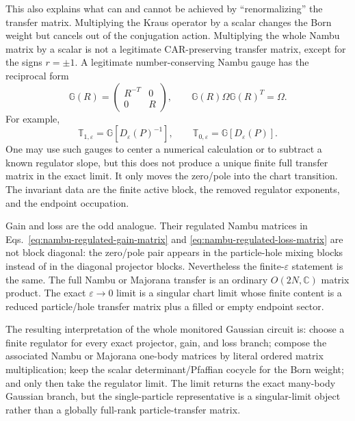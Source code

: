 \documentclass[aps,prb,onecolumn,nofootinbib,superscriptaddress]{revtex4-2}
\theoremstyle{plain}
\theoremstyle{definition}
\begin{document}
This also explains what can and cannot be achieved by ``renormalizing'' the
transfer matrix.  Multiplying the Kraus operator by a scalar changes the Born
weight but cancels out of the conjugation action.  Multiplying the whole
Nambu matrix by a scalar is not a legitimate CAR-preserving transfer matrix,
except for the signs \(r=\pm1\).  A legitimate number-conserving Nambu gauge
has the reciprocal form
\begin{equation}
  \mathbb G(R)=
  \begin{pmatrix}
    R^{-T}&0\\
    0&R
  \end{pmatrix},
  \qquad
  \mathbb G(R)\Omega\mathbb G(R)^T=\Omega .
  \label{eq:nambu-reciprocal-gauge}
\end{equation}
For example,
\begin{equation}
  \mathbb T_{1,\varepsilon}=\mathbb G[D_\varepsilon(P)^{-1}],
  \qquad
  \mathbb T_{0,\varepsilon}=\mathbb G[D_\varepsilon(P)] .
  \label{eq:projectors-as-singular-gauges}
\end{equation}
One may use such gauges to center a numerical calculation or to subtract a
known regulator slope, but this does not produce a unique finite full
transfer matrix in the exact limit.  It only moves the zero/pole into the
chart transition.  The invariant data are the finite active block, the
removed regulator exponents, and the endpoint occupation.

Gain and loss are the odd analogue.  Their regulated Nambu matrices in
Eqs.~\eqref{eq:nambu-regulated-gain-matrix} and
\eqref{eq:nambu-regulated-loss-matrix} are not block diagonal: the zero/pole
pair appears in the particle-hole mixing blocks instead of in the diagonal
projector blocks.  Nevertheless the finite-\(\varepsilon\) statement is the
same.  The full Nambu or Majorana transfer is an ordinary
\(O(2N,\mathbb C)\) matrix product.  The exact \(\varepsilon\to0\) limit is a
singular chart limit whose finite content is a reduced particle/hole transfer
matrix plus a filled or empty endpoint sector.

The resulting interpretation of the whole monitored Gaussian circuit is:
choose a finite regulator for every exact projector, gain, and loss branch;
compose the associated Nambu or Majorana one-body matrices by literal ordered
matrix multiplication; keep the scalar determinant/Pfaffian cocycle for the
Born weight; and only then take the regulator limit.  The limit returns the
exact many-body Gaussian branch, but the single-particle representative is a
singular-limit object rather than a globally full-rank particle-transfer
matrix.
\end{document}
